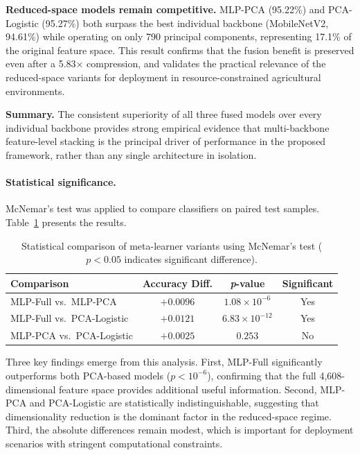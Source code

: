 \documentclass[pdflatex,sn-basic]{sn-jnl}
\begin{document}
\textbf{Reduced-space models remain competitive.}
MLP-PCA (95.22\%) and PCA-Logistic (95.27\%) both surpass the best
individual backbone (MobileNetV2, 94.61\%) while operating on only
790 principal components, representing 17.1\% of the original feature
space. This result confirms that the fusion benefit is preserved even
after a 5.83$\times$ compression, and validates the practical relevance
of the reduced-space variants for deployment in resource-constrained
agricultural environments.

\textbf{Summary.}
The consistent superiority of all three fused models over every individual
backbone provides strong empirical evidence that multi-backbone feature-level
stacking is the principal driver of performance in the proposed framework,
rather than any single architecture in isolation.
\paragraph{Statistical significance.}
McNemar's test was applied to compare classifiers on paired test samples. Table~\ref{tab:results_statistical} presents the results.

\begin{table}[htbp]
\caption{Statistical comparison of meta-learner variants using McNemar's test ($p < 0.05$ indicates significant difference).}
\label{tab:results_statistical}
\begin{tabular*}{\textwidth}{@{\extracolsep\fill}lccc@{}}
\toprule
\textbf{Comparison} & \textbf{Accuracy Diff.} & \textbf{\textit{p}-value} & \textbf{Significant} \\
\midrule
MLP-Full vs.\ MLP-PCA      & $+0.0096$ & $1.08\times10^{-6}$  & Yes \\
MLP-Full vs.\ PCA-Logistic & $+0.0121$ & $6.83\times10^{-12}$ & Yes \\
MLP-PCA vs.\ PCA-Logistic  & $+0.0025$ & $0.253$              & No  \\
\bottomrule
\end{tabular*}
\end{table}

Three key findings emerge from this analysis. First, MLP-Full significantly outperforms both PCA-based models ($p < 10^{-6}$), confirming that the full 4,608-dimensional feature space provides additional useful information. Second, MLP-PCA and PCA-Logistic are statistically indistinguishable, suggesting that dimensionality reduction is the dominant factor in the reduced-space regime. Third, the absolute differences remain modest, which is important for deployment scenarios with stringent computational constraints.
\end{document}

